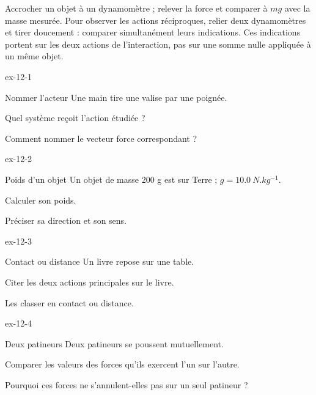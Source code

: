 \begin{experience}Accrocher un objet à un dynamomètre ; relever la force et comparer à $mg$ avec la masse mesurée. Pour observer les actions réciproques, relier deux dynamomètres et tirer doucement : comparer simultanément leurs indications. Ces indications portent sur les deux actions de l'interaction, pas sur une somme nulle appliquée à un même objet.\end{experience}
\exercices
{}
\begin{blocLivre}{ex-12-1}\begin{exercice}[1]{Nommer l’acteur}
Une main tire une valise par une poignée.
\begin{questions}
\item Quel système reçoit l’action étudiée ?
\item Comment nommer le vecteur force correspondant ?
\end{questions}
\end{exercice}\end{blocLivre}
\begin{blocLivre}{ex-12-2}\begin{exercice}[1]{Poids d’un objet}
Un objet de masse 200 g est sur Terre ; $g=\qty{10,0}{N.kg^{-1}}$.
\begin{questions}
\item Calculer son poids.
\item Préciser sa direction et son sens.
\end{questions}
\end{exercice}\end{blocLivre}
\begin{blocLivre}{ex-12-3}\begin{exercice}[1]{Contact ou distance}
Un livre repose sur une table.
\begin{questions}
\item Citer les deux actions principales sur le livre.
\item Les classer en contact ou distance.
\end{questions}
\end{exercice}\end{blocLivre}
\begin{blocLivre}{ex-12-4}\begin{exercice}[1]{Deux patineurs}
Deux patineurs se poussent mutuellement.
\begin{questions}
\item Comparer les valeurs des forces qu’ils exercent l’un sur l’autre.
\item Pourquoi ces forces ne s’annulent-elles pas sur un seul patineur ?
\end{questions}
\end{exercice}\end{blocLivre}

